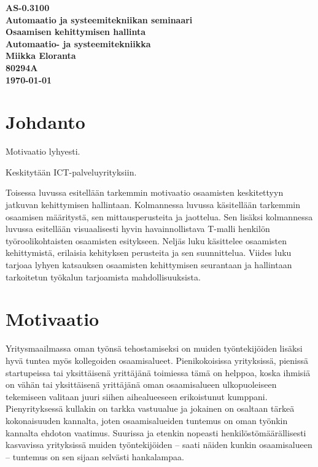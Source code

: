 \documentclass[a4paper,finnish,12pt]{article}
\begin{document}
\thispagestyle{empty}

\begin{titlepage}
    \centering
    \vspace*{10\baselineskip}
    \Large
    \bfseries
    AS-0.3100 \\ Automaatio ja systeemitekniikan seminaari \\
    \vspace{\baselineskip}
    \huge
    Osaamisen kehittymisen hallinta \\
    [1.5\baselineskip]
    \normalfont
    \vfill
    \small
    Automaatio- ja systeemitekniikka \\
    \vfill
    Miikka Eloranta \\
    80294A \\[2\baselineskip]
    \textbf{\today} \\[2\baselineskip]
    \vfill


\end{titlepage}


\clearpage

\tableofcontents

\clearpage

\section{Johdanto}

Motivaatio lyhyesti.

Keskitytään ICT-palveluyrityksiin.

Toisessa luvussa esitellään tarkemmin motivaatio osaamisten keskitettyyn jatkuvan kehittymisen hallintaan. Kolmannessa luvussa käsitellään tarkemmin osaamisen määritystä, sen mittausperusteita ja jaottelua. Sen lisäksi kolmannessa luvussa esitellään visuaalisesti hyvin havainnollistava T-malli henkilön työroolikohtaisten osaamisten esitykseen. Neljäs luku käsittelee osaamisten kehittymistä, erilaisia kehityksen perusteita ja sen suunnittelua. Viides luku tarjoaa lyhyen katsauksen osaamisten kehittymisen seurantaan ja hallintaan tarkoitetun työkalun tarjoamista mahdollisuuksista.

\clearpage

\section{Motivaatio}

Yritysmaailmassa oman työnsä tehostamiseksi on muiden työntekijöiden lisäksi hyvä tuntea myös kollegoiden osaamisalueet. Pienikokoisissa yrityksissä, pienissä startupeissa tai yksittäisenä yrittäjänä toimiessa tämä on helppoa, koska ihmisiä on vähän tai yksittäisenä yrittäjänä oman osaamisalueen ulkopuoleiseen tekemiseen valitaan juuri siihen aihealueeseen erikoistunut kumppani. Pienyrityksessä kullakin on tarkka vastuualue ja jokainen on osaltaan tärkeä kokonaisuuden kannalta, joten osaamisalueiden tuntemus on oman työnkin kannalta ehdoton vaatimus. Suurissa ja etenkin nopeasti henkilöstömäärällisesti kasvavissa yrityksissä muiden työntekijöiden -- saati näiden kunkin osaamisalueen -- tuntemus on sen sijaan selvästi hankalampaa.
\end{document}
